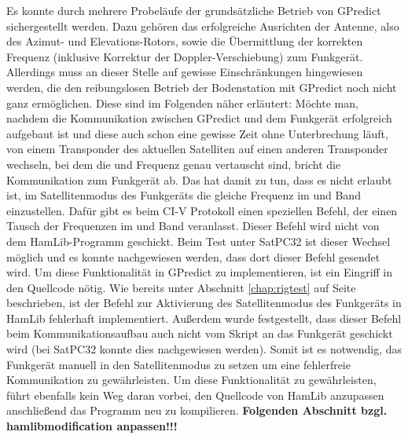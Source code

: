 Es konnte durch mehrere Probeläufe der grundsätzliche Betrieb von GPredict sichergestellt werden. Dazu gehören das erfolgreiche Ausrichten der Antenne, also des Azimut- und Elevations-Rotors, sowie die Übermittlung der korrekten Frequenz (inklusive Korrektur der Doppler-Verschiebung) zum Funkgerät. Allerdings muss an dieser Stelle auf gewisse Einschränkungen hingewiesen werden, die den reibungslosen Betrieb der Bodenstation mit GPredict noch nicht ganz ermöglichen. Diese sind im Folgenden näher erläutert:\newpar
Möchte man, nachdem die Kommunikation zwischen GPredict und dem Funkgerät erfolgreich aufgebaut ist und diese auch schon eine gewisse Zeit ohne Unterbrechung läuft, von einem Transponder des aktuellen Satelliten auf einen anderen Transponder wechseln, bei dem die  und Frequenz genau vertauscht sind, bricht die Kommunikation zum Funkgerät ab. Das hat damit zu tun, dass es nicht erlaubt ist, im Satellitenmodus des Funkgeräts die gleiche Frequenz im  und Band einzustellen. Dafür gibt es beim CI-V Protokoll einen speziellen Befehl, der einen Tausch der Frequenzen im  und Band veranlasst. Dieser Befehl wird nicht von dem HamLib-Programm  geschickt. Beim Test unter SatPC32 ist dieser Wechsel möglich und es konnte nachgewiesen werden, dass dort dieser Befehl gesendet wird. Um diese Funktionalität in GPredict zu implementieren, ist ein Eingriff in den Quellcode nötig.\newpar
Wie bereits unter Abschnitt \ref{chap:rigtest} auf Seite \pageref{satmode} beschrieben, ist der Befehl zur Aktivierung des Satellitenmodus des Funkgeräts in HamLib fehlerhaft implementiert. Außerdem wurde festgestellt, dass dieser Befehl beim Kommunikationsaufbau auch nicht vom Skript  an das Funkgerät geschickt wird (bei SatPC32 konnte dies nachgewiesen werden). Somit ist es notwendig, das Funkgerät manuell in den Satellitenmodus zu setzen um eine fehlerfreie Kommunikation zu gewährleisten. Um diese Funktionalität zu gewährleisten, führt ebenfalls kein Weg daran vorbei, den Quellcode von HamLib anzupassen anschließend das Programm  neu zu kompilieren.\newpar
\textbf{Folgenden Abschnitt bzgl. hamlibmodification anpassen!!!}\newpar
